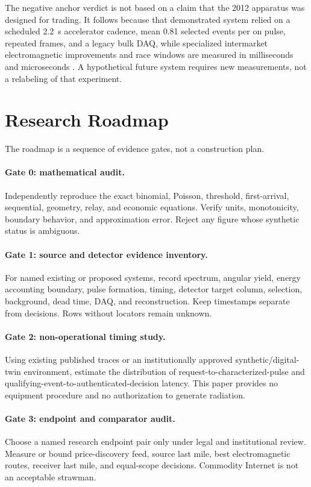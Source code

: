 \documentclass[11pt]{article}
\begin{document}
The negative anchor verdict is not based on a claim that the 2012 apparatus was designed for trading. It follows because that demonstrated system relied on a scheduled \SI{2.2}{\second} accelerator cadence, mean 0.81 selected events per on pulse, repeated frames, and a legacy bulk DAQ, while specialized intermarket electromagnetic improvements and race windows are measured in milliseconds and microseconds \citep{Laughlin2014,Aquilina2022}. A hypothetical future system requires new measurements, not a relabeling of that experiment.

\section{Research Roadmap}

The roadmap is a sequence of evidence gates, not a construction plan.

\paragraph{Gate 0: mathematical audit.} Independently reproduce the exact binomial, Poisson, threshold, first-arrival, sequential, geometry, relay, and economic equations. Verify units, monotonicity, boundary behavior, and approximation error. Reject any figure whose synthetic status is ambiguous.

\paragraph{Gate 1: source and detector evidence inventory.} For named existing or proposed systems, record spectrum, angular yield, energy accounting boundary, pulse formation, timing, detector target column, selection, background, dead time, DAQ, and reconstruction. Keep timestamps separate from decisions. Rows without locators remain unknown.

\paragraph{Gate 2: non-operational timing study.} Using existing published traces or an institutionally approved synthetic/digital-twin environment, estimate the distribution of request-to-characterized-pulse and qualifying-event-to-authenticated-decision latency. This paper provides no equipment procedure and no authorization to generate radiation.

\paragraph{Gate 3: endpoint and comparator audit.} Choose a named research endpoint pair only under legal and institutional review. Measure or bound price-discovery feed, source last mile, best electromagnetic routes, receiver last mile, and equal-scope decisions. Commodity Internet is not an acceptable strawman.
\end{document}
